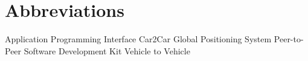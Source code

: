 \chapter*{Abbreviations}
\begin{acronym}[FHWN;-)]
 {Application Programming Interface}
 {Car2Car}
 {Global Positioning System}
 {Peer-to-Peer}
 {Software Development Kit}
 {Vehicle to Vehicle}
\end{acronym}
